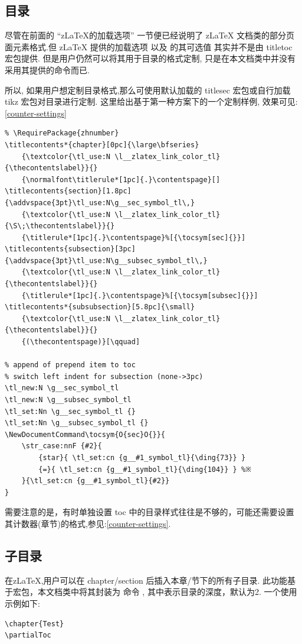 \subsection{目录}
尽管在前面的 ``z\LaTeX{}的加载选项'' 一节便已经说明了 z\LaTeX{} 文档类的部分页面元素格式.但 z\LaTeX{} 提供的加载选项 以及
的其可选值 其实并不是由 {titletoc} 宏包提供. 但是用户仍然可以将其用于目录的格式定制, 只是在本文档类中并没有
采用其提供的命令而已. 

所以, 如果用户想定制目录格式,那么可使用默认加载的 {titlesec} 宏包或自行加载 {tikz} 宏包对目录进行定制.
这里给出基于第一种方案下的一个定制样例, 效果可见:\cref{counter-settings}
\begin{verbatim}
% \RequirePackage{zhnumber}
\titlecontents*{chapter}[0pc]{\large\bfseries}
    {\textcolor{\tl_use:N \l__zlatex_link_color_tl}{\thecontentslabel}}{}
    {\normalfont\titlerule*[1pc]{.}\contentspage}[]
\titlecontents{section}[1.8pc]{\addvspace{3pt}\tl_use:N\g__sec_symbol_tl\,}
    {\textcolor{\tl_use:N \l__zlatex_link_color_tl}{\S\;\thecontentslabel}}{}
    {\titlerule*[1pc]{.}\contentspage}%[{\tocsym[sec]{}}]
\titlecontents{subsection}[3pc]{\addvspace{3pt}\tl_use:N\g__subsec_symbol_tl\,}
    {\textcolor{\tl_use:N \l__zlatex_link_color_tl}{\thecontentslabel}}{}
    {\titlerule*[1pc]{.}\contentspage}%[{\tocsym[subsec]{}}]
\titlecontents*{subsubsection}[5.8pc]{\small}
    {\textcolor{\tl_use:N \l__zlatex_link_color_tl}{\thecontentslabel}}{}
    {(\thecontentspage)}[\qquad]

% append of prepend item to toc
% switch left indent for subsection (none->3pc)
\tl_new:N \g__sec_symbol_tl
\tl_new:N \g__subsec_symbol_tl
\tl_set:Nn \g__sec_symbol_tl {}
\tl_set:Nn \g__subsec_symbol_tl {}
\NewDocumentCommand\tocsym{O{sec}O{}}{
    \str_case:nnF {#2}{
        {star}{ \tl_set:cn {g__#1_symbol_tl}{\ding{73}} }
        {=}{ \tl_set:cn {g__#1_symbol_tl}{\ding{104}} } %※
    }{\tl_set:cn {g__#1_symbol_tl}{#2}}
} 
\end{verbatim}

需要注意的是，有时单独设置 toc 中的目录样式往往是不够的，可能还需要设置其计数器(章节)的格式,参见:\cref{counter-settings}.

\subsection{子目录}
在z\LaTeX{},用户可以在 chapter/section 后插入本章/节下的所有子目录. 此功能基于宏包，本文档类中将其封装为 
命令 \cmd[F]{\partialToc[<depth>]}, 其中表示目录的深度，默认为2. 一个使用示例如下:
\begin{verbatim}
\chapter{Test}
\partialToc
\end{verbatim}

